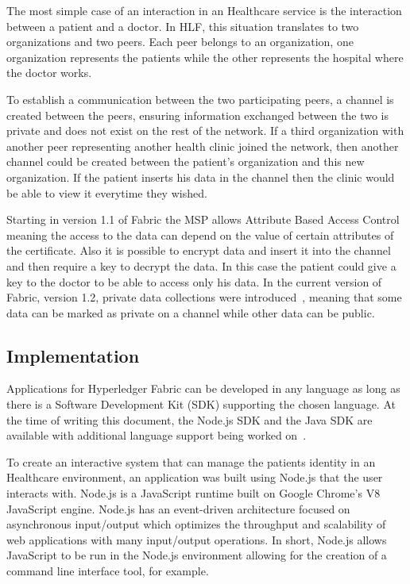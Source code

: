 The most simple case of an interaction in an Healthcare service is the
interaction between a patient and a doctor. In HLF, this situation translates
to two organizations and two peers. Each peer belongs to an organization, one
organization represents the patients while the other represents the hospital
where the doctor works. 

To establish a communication between the two participating peers, a channel is
created between the peers, ensuring information exchanged between the two is
private and does not exist on the rest of the network.  If a third organization
with another peer representing another health clinic joined the network, then
another channel could be created between the patient's organization and this
new organization. If the patient inserts his data in the channel then the
clinic would be able to view it everytime they wished. 

Starting in version 1.1 of Fabric the MSP allows Attribute Based Access Control
meaning the access to the data can depend on the value of certain attributes of
the certificate. Also it is possible to encrypt data and insert it into the
channel and then require a key to decrypt the data. In this case the patient
could give a key to the doctor to be able to access only his data. In the
current version of Fabric, version 1.2, private data collections were
introduced~\cite{hyperledgerRoadmap2018}, meaning that some data can be marked
as private on a channel while other data can be public.

\subsection{Implementation}

Applications for Hyperledger Fabric can be developed in any language as long as
there is a Software Development Kit (SDK) supporting the chosen language. At
the time of writing this document, the Node.js SDK and the Java SDK are
available with additional language support being worked
on~\cite{hyperledgerRoadmap2018}.

To create an interactive system that can manage the patients identity in an
Healthcare environment, an application was built using Node.js that the user
interacts with. Node.js is a JavaScript runtime built on Google Chrome's V8
JavaScript engine. Node.js has an event-driven architecture focused on
asynchronous input/output which optimizes the throughput and scalability of web
applications with many input/output operations. In short, Node.js allows
JavaScript to be run in the Node.js environment allowing for the creation of a
command line interface tool, for example.

